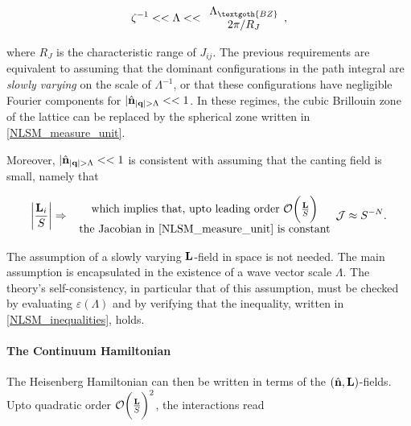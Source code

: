 \begin{equation}
    \zeta^{-1} << \Lambda << \begin{array}{cc}
         \Lambda_{\textgoth{BZ}} \\
         {2\pi}/{R_J}
    \end{array},
    \label{NLSM_inequalities}
\end{equation}
    
where $R_J$ is the characteristic range of $J_{ij}$. The previous requirements are equivalent to assuming that the dominant configurations in the path integral are \textit{slowly varying} on the scale of $\Lambda^{-1}$, or that these configurations have negligible Fourier components for $|\hat{\bf n}_{|{\bf q}| > \Lambda} << 1$. In these regimes, the cubic Brillouin zone of the lattice can be replaced by the spherical zone written in \cref{NLSM_measure_unit}. 

Moreover, $|\hat{\bf n}_{|{\bf q}| > \Lambda} << 1$ is consistent with assuming that the canting field is small, namely that 

$$
\bigg|\frac{{\bf L}_i}{S}\bigg| \Rightarrow \begin{array}{cc}
     \textnormal{ which implies that, upto leading order } \mathcal{O}\bigg(\frac{{\bf L}}{S}\bigg)  \\
     \textnormal{ the Jacobian in \cref{NLSM_measure_unit} is constant}
\end{array} \mathcal{J} \approx S^{-N}.
$$

The assumption of a slowly varying ${\bf L}$-field in space is not needed. The main assumption is encapsulated in the existence of a wave vector scale $\Lambda$. The theory's self-consistency, in particular that of this assumption, must be checked by evaluating $\varepsilon(\Lambda)$ and by verifying that the inequality, written in \cref{NLSM_inequalities}, holds. \\

\paragraph{The Continuum Hamiltonian}

The Heisenberg Hamiltonian can then be written in terms of the $(\hat{\bf n}, {\bf L})$-fields. Upto quadratic order $\mathcal{O}\bigg(\frac{{\bf L}}{S}\bigg)^2$, the interactions read

